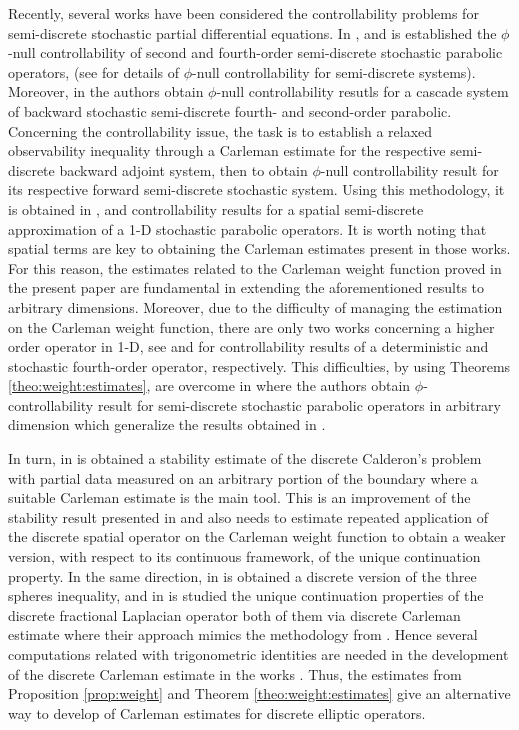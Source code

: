 \documentclass[11pt,oneside,leqno]{amsart}
\numberwithin{equation}{section}
\numberwithin{equation}{section}
\begin{document}
\par Recently, several works have been considered the controllability problems for semi-discrete stochastic partial differential equations. In \cite{zhao:2024}, \cite{WZ:2025} and \cite{WZ:2024} is established the $\phi$-null controllability of second and fourth-order semi-discrete stochastic parabolic operators, (see \cite{boyer-canum} for details of $\phi$-null controllability for semi-discrete systems). Moreover, in \cite{LL:2026} the authors obtain $\phi$-null controllability resutls for a cascade system of backward stochastic semi-discrete fourth- and second-order parabolic. Concerning the controllability issue, the task is to establish a relaxed observability inequality through a  Carleman estimate for the respective semi-discrete backward adjoint system, then to obtain $\phi$-null controllability result for its respective forward semi-discrete stochastic system. Using this methodology, it is obtained in \cite{zhao:2024}, \cite{WZ:2025} and  \cite{WZ:2024} controllability results for a spatial semi-discrete approximation of a 1-D stochastic parabolic operators. It is worth noting that spatial terms are key to obtaining the Carleman estimates present in those works. For this reason, the estimates related to the Carleman weight function proved in the present paper are fundamental in extending the aforementioned results to arbitrary dimensions. Moreover, due to the difficulty of managing the estimation on the Carleman weight function, there are only two works concerning a higher order operator in 1-D, see \cite{CLTP-2022} and \cite{WZ:2024} for controllability results of a deterministic and stochastic fourth-order operator, respectively. This difficulties, by using Theorems \ref{theo:weight:estimates}, are overcome in \cite{LPP:2026} where the authors obtain $\phi$-controllability result for semi-discrete stochastic parabolic operators in arbitrary dimension which generalize the results obtained in \cite{zhao:2024}.
\par In turn, in \cite{ZY-2024} is obtained a stability estimate of the discrete Calderon's problem with partial data measured on an arbitrary portion of the boundary where a suitable Carleman estimate is the main tool. This is an improvement of the stability result presented in \cite{LDOP-2021} and also needs to estimate repeated application of the discrete spatial operator on the Carleman weight function to obtain a weaker version, with respect to its continuous framework, of the unique continuation property. In the same direction, in \cite{FB:R:R-2021} is obtained a discrete version of the three spheres inequality, and in \cite{FB:R:R:2024} is studied the unique continuation properties of the discrete fractional Laplacian operator both of them via discrete Carleman estimate where their approach mimics the methodology from \cite{ervedoza-2011}. Hence several computations related with trigonometric identities are needed in the development of the discrete Carleman estimate in the works \cite{FB:R:R-2021,ervedoza-2011,LDOP-2021}. Thus, the estimates from Proposition \ref{prop:weight} and Theorem \ref{theo:weight:estimates} give an alternative way to develop of Carleman estimates for discrete elliptic operators. 
\end{document}
